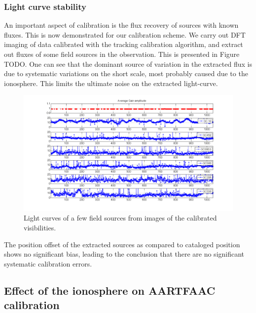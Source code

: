 \documentclass{aa}
\begin{document}
\subsubsection{Light curve stability}

An important  aspect of calibration is  the flux recovery of  sources with known
fluxes. This is  now demonstrated for our calibration scheme.   We carry out DFT
imaging of data calibrated with  the tracking calibration algorithm, and extract
out  fluxes of  some field  sources in  the observation.   This is  presented in
Figure TODO. One can see that  the dominant source of variation in the extracted
flux is  due to systematic variations  on the short scale,  most probably caused
due  to  the  ionosphere.  This  limits  the ultimate  noise  on  the  extracted
light-curve.

\begin{figure}[tbh]
\includegraphics[width=1\textwidth]{Figs/gain_monlightcurves_newafaac_beam}

\caption{\textcolor{red}{\label{fig:Light-curves-of}}Light curves of a few
field sources from images of the calibrated visibilities.}
\end{figure}
The position offset  of the extracted sources as  compared to cataloged position
shows  no  significant  bias,  leading  to  the conclusion  that  there  are  no
significant systematic calibration errors.


\subsection{\label{sub:iono-effect-on-calib}Effect of the ionosphere on AARTFAAC
calibration}
\end{document}
